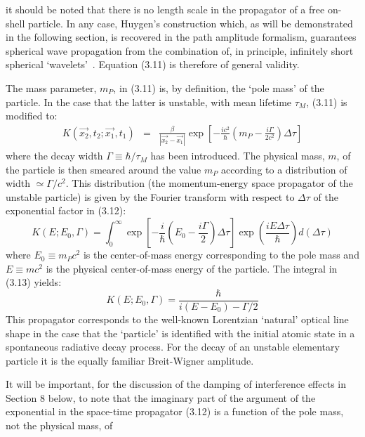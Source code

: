 { it should be noted that there is no length scale in the propagator of a free on-shell
  particle. In any case, Huygen's construction which, as will be demonstrated in the following
  section, is recovered in the path amplitude formalism, guarantees spherical wave propagation
  from the combination of, in principle, infinitely short spherical `wavelets'~\cite{BW1}.
  Equation (3.11) is therefore of general validity.
 \par The mass parameter, $m_P$, in (3.11) is, by  definition, the `pole mass' of the 
  particle. In the case that the latter is unstable, with mean lifetime $\tau_M$, (3.11) is 
   modified to:
   \begin{eqnarray}
    K(\vec{x_2},t_2; \vec{x_1},t_1) & = &  \frac{\beta}{|\vec{x_2}-\vec{x_1}|}
 \exp\left[-\frac{i c^2}{\hbar}( m_P-\frac{i \Gamma}{2 c^2})\Delta  \tau\right] 
 \end{eqnarray}
  where the decay width $\Gamma \equiv \hbar/\tau_M$ has been introduced.
 The physical mass, $m$,  of the particle is then smeared around the value
  $m_P$ according to a distribution of width $\simeq \Gamma/c^2 $. This distribution
  (the momentum-energy space propagator of the unstable particle) is given by the Fourier
  transform with respect to $\Delta  \tau$ of the exponential factor in (3.12):
  \begin{equation}
  K(E;E_0,\Gamma) = \int_0^{\infty}
   \exp\left[-\frac{i}{\hbar}( E_0-\frac{i \Gamma}{2})\Delta  \tau \right]
    \exp\left(\frac{i E \Delta  \tau}{\hbar}\right) d(\Delta  \tau)
   \end{equation}
 where $E_0 \equiv m_P c^2$ is the center-of-mass energy corresponding to the
  pole mass and  $E \equiv m c^2$ is the physical center-of-mass energy of
   the particle. The integral in (3.13) yields:
  \begin{equation}
   K(E;E_0,\Gamma) = \frac{\hbar}{i(E-E_0) -\Gamma/2}
 \end{equation}
  This propagator corresponds to the well-known Lorentzian `natural'
  optical line shape in the case that the `particle' is identified
   with the initial atomic state in a spontaneous radiative decay process.
   For the decay of an unstable elementary particle it is the equally familiar
   Breit-Wigner amplitude. 
   \par It will be important, for the discussion of the damping of
   interference effects in Section 8 below, to note that the imaginary part
   of the argument of the exponential in the space-time propagator
   (3.12) is a function of the pole mass, not the physical mass, of
}
